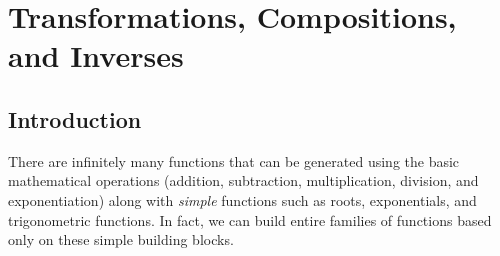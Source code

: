 \section{Transformations, Compositions, and Inverses} \label{S:0.3.Transformations}


\vspace*{-14 pt}



\nin \hrulefill


\subsection*{Introduction}
There are infinitely many functions that can be generated using the basic mathematical
operations (addition, subtraction, multiplication, division, and exponentiation) along
with {\it simple} functions such as roots, exponentials, and trigonometric functions.  In
fact, we can build entire families of functions based only on these simple building
blocks.




